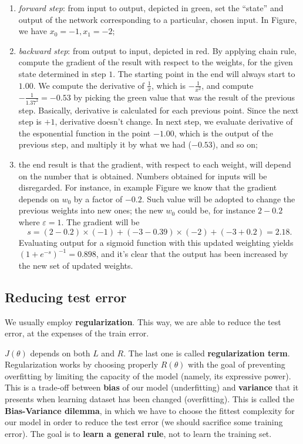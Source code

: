 \documentclass[10pt]{report}
\begin{document}
\begin{enumerate}
\item \emph{forward step}: from input to output, depicted in green, set the
``state'' and output of the network corresponding to a particular,
chosen input. In Figure, we have \(x_0 = -1, x_1 = -2\);
\item \emph{backward step}: from output to input, depicted in red. By applying
chain rule, compute the gradient of the result with respect to the
weights, for the given state determined in step \(1\). The starting
point in the end will always start to \(1.00\). We compute the
derivative of \(\frac{1}{x}\), which is \(-\frac{1}{x^2}\), and
compute \(-\frac{1}{1.37^2} = -0.53\) by picking the green value that
was the result of the previous step. Basically, derivative is
calculated for each previous point. Since the next step is \(+1\),
derivative doesn't change. In next step, we evaluate derivative of
the esponential function in the point \(-1.00\), which is the output
of the previous step, and multiply it by what we had (\(-0.53\)), and
so on;
\item the end result is that the gradient, with respect to each
weight, will depend on the number that is obtained. Numbers obtained
for inputs will be disregarded. For instance, in example Figure we
know that the gradient depends on \(w_0\) by a factor of \(-0.2\).
Such value will be adopted to change the previous weights into new
ones; the new \(w_0\) could be, for instance \(2 - 0.2\) where
\(\varepsilon = 1\). The gradient will be
\[ s = (2-0.2) \times (-1) + (-3-0.39) \times (-2) + (-3+0.2) = 2.18.\] Evaluating output for a sigmoid function with
this updated weighting yields \((1 + e^{-s})^{-1} = 0.898\), and it's
clear that the output has been increased by the new set of updated
weights.
\end{enumerate}

\subsection{Reducing test error}
\label{reducing-test-error}
We usually employ \textbf{regularization}. This way, we are able to reduce the
test error, at the expenses of the train error.

\(J(\theta)\) depends on both \(L\) and \(R\). The last one is called
\textbf{regularization term}. Regularization works by choosing properly
\(R(\theta)\) with the goal of preventing overfitting by limiting the
capacity of the model (namely, its expressive power). This is a
trade-off between \textbf{bias} of our model (underfitting) and \textbf{variance} that
it presents when learning dataset has been changed (overfitting). This
is called the \textbf{Bias-Variance dilemma}, in which we have to choose the
fittest complexity for our model in order to reduce the test error (we
should sacrifice some training error). The goal is to \textbf{learn a general
rule}, not to learn the training set.
\end{document}
